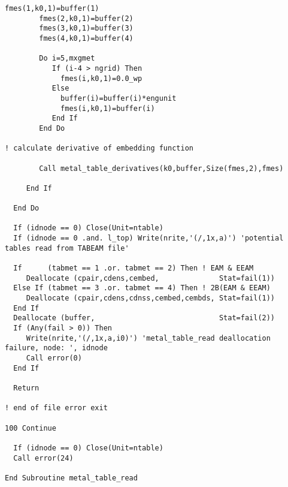 \begin{lstlisting}[style=sFortran,caption={Add two numbers function}]
        fmes(1,k0,1)=buffer(1)
        fmes(2,k0,1)=buffer(2)
        fmes(3,k0,1)=buffer(3)
        fmes(4,k0,1)=buffer(4)

        Do i=5,mxgmet
           If (i-4 > ngrid) Then
             fmes(i,k0,1)=0.0_wp
           Else
             buffer(i)=buffer(i)*engunit
             fmes(i,k0,1)=buffer(i)
           End If
        End Do

! calculate derivative of embedding function

        Call metal_table_derivatives(k0,buffer,Size(fmes,2),fmes)

     End If

  End Do

  If (idnode == 0) Close(Unit=ntable)
  If (idnode == 0 .and. l_top) Write(nrite,'(/,1x,a)') 'potential tables read from TABEAM file'

  If      (tabmet == 1 .or. tabmet == 2) Then ! EAM & EEAM
     Deallocate (cpair,cdens,cembed,              Stat=fail(1))
  Else If (tabmet == 3 .or. tabmet == 4) Then ! 2B(EAM & EEAM)
     Deallocate (cpair,cdens,cdnss,cembed,cembds, Stat=fail(1))
  End If
  Deallocate (buffer,                             Stat=fail(2))
  If (Any(fail > 0)) Then
     Write(nrite,'(/,1x,a,i0)') 'metal_table_read deallocation failure, node: ', idnode
     Call error(0)
  End If

  Return

! end of file error exit

100 Continue

  If (idnode == 0) Close(Unit=ntable)
  Call error(24)

End Subroutine metal_table_read

\end{lstlisting}







